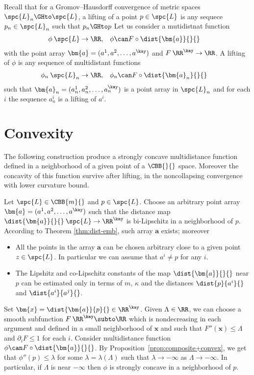 Recall that for a Gromov--Hausdorff convergence of metric spaces
$\spc{L}_n\GHto\spc{L}$,
a lifting of a point $p\in \spc{L}$ is any sequece $p_n\in\spc{L}_n$ such that $p_n\GHto p$
Let us consider a mutidistnat function 
\begin{align*}
\phi&\:\spc{L}\to\RR,
&
\phi&\can F\circ\dist{\bm{a}}{}{}
\end{align*}
with the point array $\bm{a}=(a^1,a^2,\dots,a^\kay)$ and $F\:\RR^\kay\to \RR$.
A lifting of $\phi$ is any sequence of multidistant 
functions 
 \begin{align*}
\phi_n
&\:\spc{L}_n\to\RR,
&
\phi_n
&\can F\circ\dist{\bm{a}_n}{}{}
\end{align*}
such that $\bm{a}_n=(a_n^1,a_n^2,\dots,a_n^\kay)$
is a point array in $\spc{L}_n$
and for each $i$ the sequence $a_n^i$ is a lifting of $a^i$.



\section{Convexity}

The following construction produce 
a strongly concave multidistance function
defined in a neighborhood of a given point 
of a $\CBB{}{}$ space.
Moreover the concavity of this function survive 
after lifting, in the noncollapsing convergence 
with lower curvature bound.

Let $\spc{L}\in\CBB{m}{}$ and $p\in\spc{L}$.
Choose an arbitrary point array 
$\bm{a}=(a^1,a^2,\dots,a^\kay)$
such that the distance map $\dist{\bm{a}}{}{}\:\spc{L}\to\RR^\kay$ is bi-Lipschitz in a neighborhood of $p$.
According to  Theorem \ref{thm:dist-emb},
such array $\bm{a}$ exists; 
moreover 
\begin{itemize}
\item All the points in the array $\bm{a}$ can be chosen arbitrary close to a given point $z\in \spc{L}$. In particular we can assume that $a^i\ne p$ for any $i$.
\item The Lipshitz and co-Lipschitz constants of the map $\dist{\bm{a}}{}{}$ near $p$ can be estimated only in terms of $m$, $\kappa$ and the distances $\dist{p}{a^i}{}$ and $\dist{a^i}{a^j}{}$. 
\end{itemize}

Set $\bm{x}=\dist{\bm{a}}{p}{}\in\RR^\kay$.
Given $\Lambda\in\RR$,
we can choose a smooth subfunction $F\:\RR^\kay\subto\RR$
which is nondecreasing in each argument
and defined in a small neighborhood of $\bm{x}$
and such that $F''(\bm{x})\le \Lambda$ and $\partial_iF\le 1$ for each $i$.
Consider multidistance function $\phi\can F\circ\dist{\bm{a}}{}{}$.
By Proposition~\ref{prop:composite+convex},
we get that $\phi''(p)\le \lambda$
for some $\lambda=\lambda(\Lambda)$ such that
$\lambda\to-\infty$ as $\Lambda\to-\infty$.
In particular, if $\Lambda$ is near $-\infty$
then $\phi$ is strongly concave 
in a neighborhood of $p$.

